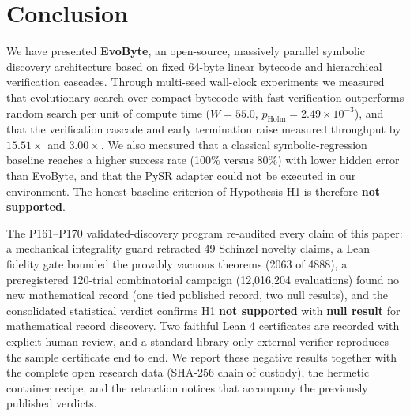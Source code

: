 \documentclass[11pt,a4paper]{article}
\begin{document}
\section{Conclusion}
We have presented \textbf{EvoByte}, an open-source, massively parallel symbolic discovery architecture based on fixed 64-byte linear bytecode and hierarchical verification cascades. Through multi-seed wall-clock experiments we measured that evolutionary search over compact bytecode with fast verification outperforms random search per unit of compute time ($W = 55.0$, $p_{\text{Holm}} = 2.49 \times 10^{-3}$), and that the verification cascade and early termination raise measured throughput by $15.51\times$ and $3.00\times$. We also measured that a classical symbolic-regression baseline reaches a higher success rate (100\% versus 80\%) with lower hidden error than EvoByte, and that the PySR adapter could not be executed in our environment. The honest-baseline criterion of Hypothesis H1 is therefore \textbf{not supported}.

The P161--P170 validated-discovery program re-audited every claim of this paper: a mechanical
integrality guard retracted 49 Schinzel novelty claims, a Lean fidelity gate bounded the
provably vacuous theorems (2063 of 4888), a preregistered 120-trial combinatorial campaign
(12,016,204 evaluations) found no new mathematical record (one tied published record, two
null results), and the consolidated statistical verdict confirms H1 \textbf{not supported}
with \textbf{null result} for mathematical record discovery. Two faithful Lean 4 certificates
are recorded with explicit human review, and a standard-library-only external verifier
reproduces the sample certificate end to end. We report these negative results together with
the complete open research data (SHA-256 chain of custody), the hermetic container recipe,
and the retraction notices that accompany the previously published verdicts.
\end{document}
